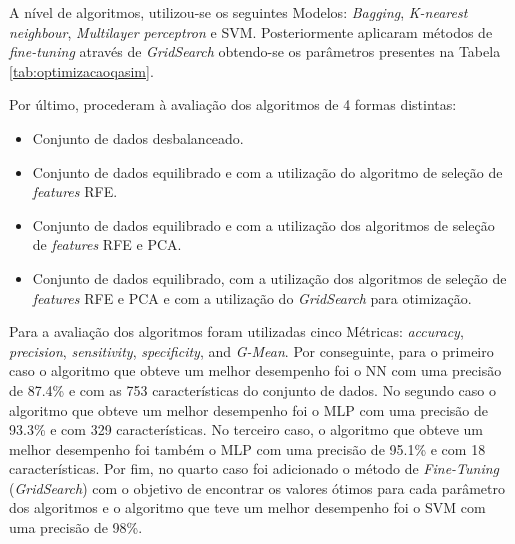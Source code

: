 \documentclass[12pt,a4paper,twoside]{report}
\begin{document}
{A nível de algoritmos, utilizou-se os seguintes Modelos: \textit{Bagging}, \textit{K-nearest neighbour}, \textit{Multilayer perceptron} e \gls{SVM}. Posteriormente aplicaram métodos de \textit{fine-tuning} através de \textit{GridSearch} obtendo-se os parâmetros presentes na Tabela \ref{tab:optimizacaoqasim}. 

\begin{table}[H]
\small
\caption{Algoritmos utilizados, bem como os parâmetros \cite{medicina57111217}.}
\label{tab:optimizacaoqasim}
\centering
{}
\end{table}

Por último, procederam à avaliação dos algoritmos de 4 formas distintas:

\begin{itemize} 
\itemsep-0.5em 
    \item Conjunto de dados desbalanceado.
    \item Conjunto de dados equilibrado e com a utilização do algoritmo de seleção de \textit{features} \gls{RFE}.
    \item Conjunto de dados equilibrado e com a utilização dos algoritmos de seleção de \textit{features} \gls{RFE} e \gls{PCA}.
    \item Conjunto de dados equilibrado, com a utilização dos algoritmos de seleção de \textit{features} \gls{RFE} e \gls{PCA} e com a utilização do \textit{GridSearch} para otimização.
\end{itemize}

Para a avaliação dos algoritmos foram utilizadas cinco Métricas: \textit{accuracy}, \textit{precision}, \textit{sensitivity}, \textit{specificity}, and \textit{G-Mean}. Por conseguinte, para o primeiro caso o algoritmo que obteve um melhor desempenho foi o \gls{NN} com uma precisão de 87.4\% e com as 753 características do conjunto de dados. No segundo caso o algoritmo que obteve um melhor desempenho foi o \Gls{MLP} com uma precisão de 93.3\% e com 329 características. No terceiro caso, o algoritmo que obteve um melhor desempenho foi também o \gls{MLP} com uma precisão de 95.1\% e com 18 características. Por fim, no quarto
caso foi adicionado o método de \textit{Fine-Tuning} (\textit{GridSearch}) com o objetivo de encontrar os valores ótimos para cada parâmetro dos algoritmos e o algoritmo que teve um melhor desempenho foi o \gls{SVM} com uma precisão de 98\%.

}
\end{document}
